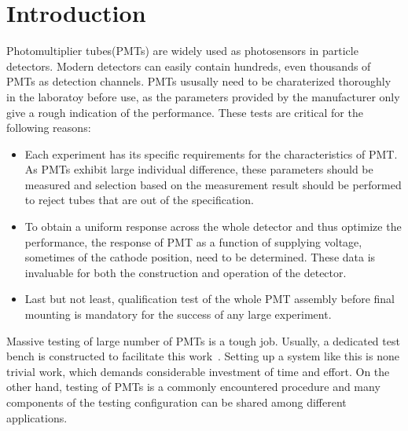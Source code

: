 \documentclass[5p, times]{elsarticle}
\begin{document}
\section{Introduction}
\label{sec:introduction}

Photomultiplier tubes(PMTs) are widely used as photosensors in particle detectors.
Modern detectors can easily contain hundreds, even thousands of PMTs as detection channels.
PMTs ususally need to be charaterized thoroughly in the laboratoy before use, as the parameters provided by the manufacturer only give a rough indication of the performance.
These tests are critical for the following reasons:
\begin{itemize}
 \item Each experiment has its specific requirements for the characteristics of PMT.
 As PMTs exhibit large individual difference, these parameters should be measured and selection based on the measurement result should be performed to reject tubes that are out of the specification.
 \item To obtain a uniform response across the whole detector and thus optimize the performance, the response of PMT as a function of supplying voltage, sometimes of the cathode position, need to be determined.
  These data is invaluable for both the construction and operation of the detector. 
 \item Last but not least, qualification test of the whole PMT assembly before final mounting is mandatory for the success of any large experiment. 
\end{itemize}

Massive testing of large number of PMTs is a tough job.
Usually, a dedicated test bench is constructed to facilitate this work~\cite{barnhill_testing_2008,akgun_complete_2005,adragna_pmt-block_2006}.
Setting up a system like this is none trivial work, which demands considerable investment of time and effort.
On the other hand, testing of PMTs is a commonly encountered procedure and many components of the testing configuration can be shared among different applications.
\end{document}

